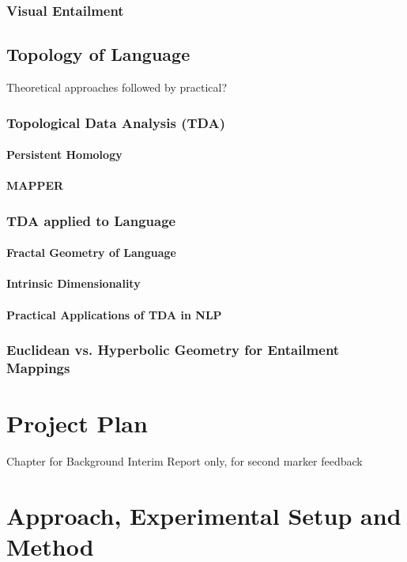 \documentclass[12pt,twoside]{report}
\begin{document}
\subsection{Visual Entailment}


\section{Topology of Language}
Theoretical approaches followed by  practical?
\subsection{Topological Data Analysis (TDA)}
\subsubsection{Persistent Homology}
\subsubsection{MAPPER}
\subsection{TDA applied to Language}
\subsubsection{Fractal Geometry of Language}
\subsubsection{Intrinsic Dimensionality}
\subsubsection{Practical Applications of TDA in NLP}
\subsection{Euclidean vs. Hyperbolic Geometry for Entailment Mappings}



\chapter{Project Plan}
Chapter for Background Interim Report only, for second marker feedback




\chapter{Approach, 
Experimental Setup and Method}
\end{document}
